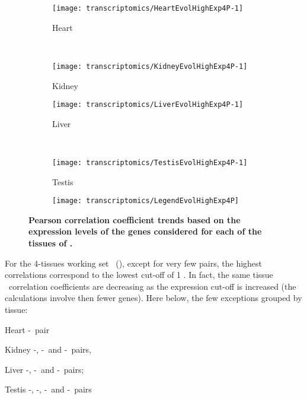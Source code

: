 \begin{sidewaysfigure}[!htpb]
    \centering
    \begin{subfigure}[b]{0.48\textwidth}\centering
        \texttt{[image: transcriptomics/HeartEvolHighExp4P-1]}
        \caption{Heart}\label{fig:CorHighExpHeart4T}
    \end{subfigure}%
~%
    \begin{subfigure}[b]{0.48\textwidth}\centering
        \texttt{[image: transcriptomics/KidneyEvolHighExp4P-1]}
        \caption{Kidney}\label{fig:CorHighExpKidney4T}
    \end{subfigure}

    \begin{subfigure}[b]{0.48\textwidth}\centering
        \texttt{[image: transcriptomics/LiverEvolHighExp4P-1]}
        \caption{Liver}\label{fig:CorHighExpLiver4T}
    \end{subfigure}%
~%
    \begin{subfigure}[b]{0.48\textwidth}\centering
        \texttt{[image: transcriptomics/TestisEvolHighExp4P-1]}
        \caption{Testis}\label{fig:CorHighExpTestis4T}
    \end{subfigure}
    \begin{subfigure}[b]{\textwidth}\centering
        \texttt{[image: transcriptomics/LegendEvolHighExp4P]}
    \end{subfigure}
    \caption[Pearson correlation coefficient trends based on the expression
    levels of the genes considered for \setOne]{%
\label{fig:CorHighExp4T}\textbf{Pearson correlation coefficient trends
    based on the expression levels of the genes considered for each of the tissues
    of \setOne.}}
\end{sidewaysfigure}

For the 4-tissues working set \setOne\ (),
except for very few pairs, the highest correlations correspond to
the lowest cut-off of 1 \FPKM\@.
In fact, the same tissue \trep\ correlation coefficients
are decreasing as the expression cut-off is increased
(the calculations involve then fewer genes).
Here below, the few exceptions grouped by tissue:
\begin{eqlist}
\item[Heart] \uhlen{}-\gtex\ pair
\item[Kidney] \uhlen{}-\gtex, \castle{}-\uhlen\ and \castle{}-\gtex\ pairs,
\item[Liver]  \vt{}-\ibm, \ibm{}-\uhlen\ and \ibm{}-\uhlen\ pairs;
\item[Testis] \ibm{}-\uhlen, \vt{}-\gtex, \vt{}-\uhlen\ and \uhlen{}-\gtex\ pairs
\end{eqlist}

